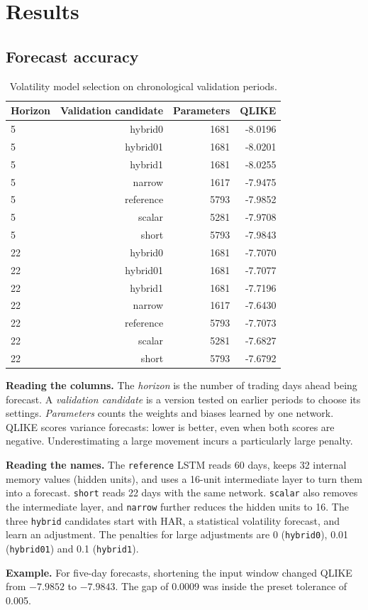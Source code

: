 \documentclass[11pt]{article}
\begin{document}
\section{Results}
\subsection{Forecast accuracy}
\begin{table}[htbp]\centering\small\setlength{\tabcolsep}{4pt}\caption{Volatility model selection on chronological validation periods.}\label{tab:validation}
\begin{tabular}{lrrr}
\hline
Horizon & Validation candidate & Parameters & QLIKE \\
\hline
5 & hybrid0 & 1681 & -8.0196 \\
5 & hybrid01 & 1681 & -8.0201 \\
5 & hybrid1 & 1681 & -8.0255 \\
5 & narrow & 1617 & -7.9475 \\
5 & reference & 5793 & -7.9852 \\
5 & scalar & 5281 & -7.9708 \\
5 & short & 5793 & -7.9843 \\
22 & hybrid0 & 1681 & -7.7070 \\
22 & hybrid01 & 1681 & -7.7077 \\
22 & hybrid1 & 1681 & -7.7196 \\
22 & narrow & 1617 & -7.6430 \\
22 & reference & 5793 & -7.7073 \\
22 & scalar & 5281 & -7.6827 \\
22 & short & 5793 & -7.6792 \\
\hline
\end{tabular}\par\vspace{6pt}\begin{minipage}{.97\linewidth}\small\setlength{\parskip}{4pt}
\textbf{Reading the columns.} The \emph{horizon} is the number of trading days ahead being forecast. A \emph{validation candidate} is a version tested on earlier periods to choose its settings. \emph{Parameters} counts the weights and biases learned by one network. QLIKE scores variance forecasts: lower is better, even when both scores are negative. Underestimating a large movement incurs a particularly large penalty.

\textbf{Reading the names.} The \texttt{reference} LSTM reads 60 days, keeps 32 internal memory values (hidden units), and uses a 16-unit intermediate layer to turn them into a forecast. \texttt{short} reads 22 days with the same network. \texttt{scalar} also removes the intermediate layer, and \texttt{narrow} further reduces the hidden units to 16. The three \texttt{hybrid} candidates start with HAR, a statistical volatility forecast, and learn an adjustment. The penalties for large adjustments are 0 (\texttt{hybrid0}), 0.01 (\texttt{hybrid01}) and 0.1 (\texttt{hybrid1}).

\textbf{Example.} For five-day forecasts, shortening the input window changed QLIKE from $-7.9852$ to $-7.9843$. The gap of 0.0009 was inside the preset tolerance of 0.005.
\end{minipage}\end{table}
\end{document}
